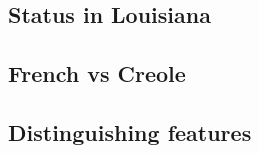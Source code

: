     \subsection{Status in Louisiana}
    \subsection{French vs Creole}
    \subsection{Distinguishing features}
